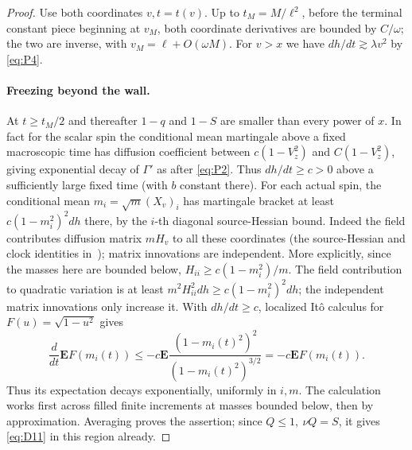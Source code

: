 \begin{proof}
Use both coordinates \(v,t=t(v)\). Up to \(t_M=M/\ell^2\), before the terminal constant piece beginning at \(v_M\), both coordinate derivatives are bounded by \(C/\omega\); the two are inverse, with \(v_M=\ell+O(\omega M)\). For \(v>x\) we have \(dh/dt\gtrsim\lambda v^2\) by \eqref{eq:P4}.

\paragraph{Freezing beyond the wall.}
At \(t\ge t_M/2\) and thereafter \(1-q\) and \(1-S\) are smaller than every power of \(x\). In fact for the scalar spin the conditional mean martingale above a fixed macroscopic time has diffusion coefficient between \(c(1-V_z^2)\) and \(C(1-V_z^2)\), giving exponential decay of \(\Gamma'\) as after \eqref{eq:P2}. Thus \(dh/dt\ge c>0\) above a sufficiently large fixed time (with \(b\) constant there). For each actual spin, the conditional mean \(m_i=\sqrt m (X_v)_i\) has martingale bracket at least \(c(1-m_i^2)^2dh\) there, by the \(i\)-th diagonal source-Hessian bound. Indeed the field contributes diffusion matrix \(m H_v\) to all these coordinates (the source-Hessian and clock identities in~\cite[Section~2]{PE}); matrix innovations are independent. More explicitly, since the masses here are bounded below,
$H_{ii}\ge c(1-m_i^2)/m$.  The field contribution to quadratic
variation is at least
$m^2H_{ii}^2dh\ge c(1-m_i^2)^2dh$; the independent matrix
innovations only increase it.  With $dh/dt\ge c$, localized It\^o
calculus for $F(u)=\sqrt{1-u^2}$ gives
\[
 \frac d{dt}\mathbf EF(m_i(t))
 \le -c\mathbf E
       \frac{(1-m_i(t)^2)^2}{(1-m_i(t)^2)^{3/2}}
 =-c\mathbf EF(m_i(t)).
\]
Thus its expectation decays exponentially, uniformly in $i,m$. The calculation works first across filled finite increments at masses bounded below, then by approximation. Averaging proves the assertion; since \(Q\le1,\ \nu Q=S\), it gives \eqref{eq:D11} in this region already.


\end{proof}
